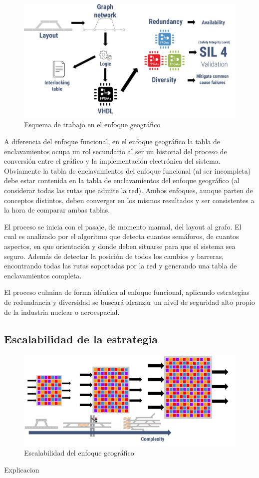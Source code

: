 		\begin{figure}[h]
		\centering
			\includegraphics[scale=.4]{./Figures/Geografico_workflow}
			\caption{Esquema de trabajo en el enfoque geográfico}
			\label{fig:Work_Geografico}
		\end{figure}
	
		A diferencia del enfoque funcional, en el enfoque geográfico la tabla de enclavamientos ocupa un rol secundario al ser un historial del proceso de conversión entre el gráfico y la implementación electrónica del sistema. Obviamente la tabla de enclavamientos del enfoque funcional (al ser incompleta) debe estar contenida en la tabla de enclavamientos del enfoque geográfico (al considerar todas las rutas que admite la red). Ambos enfoques, aunque parten de conceptos distintos, deben converger en los mismos resultados y ser consistentes a la hora de comparar ambas tablas.
		
		El proceso se inicia con el pasaje, de momento manual, del layout al grafo. El cual es analizado por el algoritmo que detecta cuantos semáforos, de cuantos aspectos, en que orientación y donde deben situarse para que el sistema sea seguro. Además de detectar la posición de todos los cambios y barreras, encontrando todas las rutas soportadas por la red y generando una tabla de enclavamientos completa.
		
		El proceso culmina de forma idéntica al enfoque funcional, aplicando estrategias de redundancia y diversidad se buscará alcanzar un nivel de seguridad alto propio de la industria nuclear o aeroespacial.
		
		\subsection{Escalabilidad de la estrategia}	
			
		\begin{figure}[h]
		\centering
			\includegraphics[scale=.4]{./Figures/Geografico_complejidad}
			\caption{Escalabilidad del enfoque geográfico}
			\label{fig:Escala_Geografico}
		\end{figure}
		
		
		
		
	Explicacion